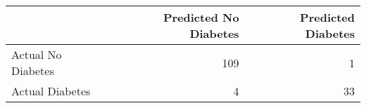 \begin{tabular}{lrr}
\toprule
 & Predicted No Diabetes & Predicted Diabetes \\
\midrule
Actual No Diabetes & 109 & 1 \\
Actual Diabetes & 4 & 33 \\
\bottomrule
\end{tabular}
